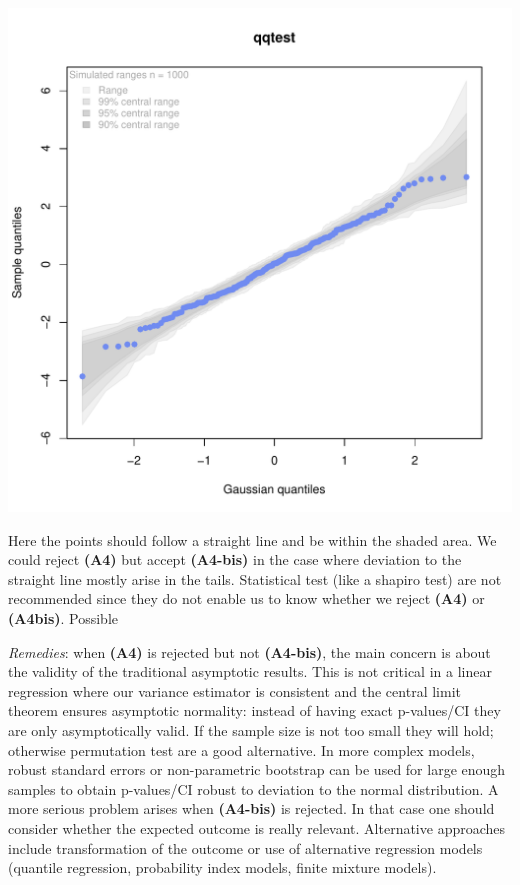 \documentclass[12pt]{article}
\begin{document}
\begin{center}
\includegraphics[width=.9\linewidth]{./figures/A4-qqplot-res.pdf}
\end{center}

Here the points should follow a straight line and be within the shaded
area. We could reject \textbf{(A4)} but accept \textbf{(A4-bis)} in the case where
deviation to the straight line mostly arise in the tails.  Statistical
test (like a shapiro test) are not recommended since they do not
enable us to know whether we reject \textbf{(A4)} or \textbf{(A4bis)}. Possible

\bigskip

\emph{Remedies}: when \textbf{(A4)} is rejected but not \textbf{(A4-bis)}, the main
concern is about the validity of the traditional asymptotic
results. This is not critical in a linear regression where our
variance estimator is consistent and the central limit theorem ensures
asymptotic normality: instead of having exact p-values/CI they are
only asymptotically valid. If the sample size is not too small they
will hold; otherwise permutation test are a good alternative. In more
complex models, robust standard errors or non-parametric bootstrap can
be used for large enough samples to obtain p-values/CI robust to
deviation to the normal distribution. \newline A more serious problem
arises when \textbf{(A4-bis)} is rejected. In that case one should consider
whether the expected outcome is really relevant. Alternative
approaches include transformation of the outcome or use of alternative
regression models (quantile regression, probability index models,
finite mixture models).
\end{document}
